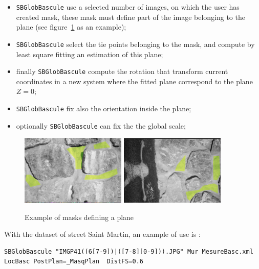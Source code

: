 \begin{itemize}
   \item {\tt SBGlobBascule} use a selected number of images, on which the
	 user has created mask, these mask must define part of the image
	 belonging to the plane (see figure~\ref{FIG:MaskPlane:StMartin} as an
	 example);

   \item {\tt SBGlobBascule} select the tie points belonging to the mask, and
	 compute by least square fitting an estimation of this  plane;


   \item finally {\tt SBGlobBascule} compute the rotation that transform
	 current coordinates in a new system where the fitted plane correspond to
	 the plane $Z=0$;

    \item {\tt SBGlobBascule}  fix  also the orientation inside the plane;

    \item optionally {\tt SBGlobBascule}  can fix the  the global scale;
\end{itemize}


\begin{figure}[H]
\begin{center}
\includegraphics[width=50mm]{FIGS/MurSaintMartin/Plan1.jpg}
\includegraphics[width=50mm]{FIGS/MurSaintMartin/Plan2.jpg}
\end{center}
\caption{Example of masks defining a plane}
\label{FIG:MaskPlane:StMartin}
\end{figure}


With the dataset of street Saint Martin, an example of use is :

{\small
\begin{verbatim}
SBGlobBascule "IMGP41((6[7-9])|([7-8][0-9])).JPG" Mur MesureBasc.xml  LocBasc PostPlan=_MasqPlan  DistFS=0.6
\end{verbatim}}

